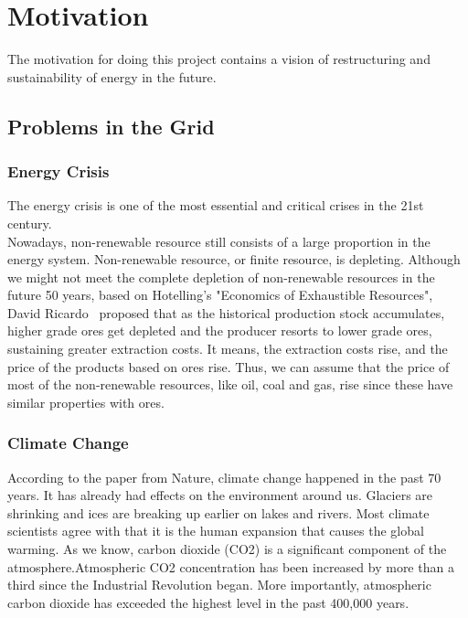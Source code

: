 \section{Motivation} %
The motivation for doing this project contains a vision of restructuring and sustainability of energy in the future.
\subsection{Problems in the Grid}
\subsubsection{Energy Crisis}
The energy crisis is one of the most essential and critical crises in the 21st century.\\





Nowadays, non-renewable resource still consists of a large proportion in the energy system. Non-renewable resource, or finite resource, is depleting. Although we might not meet the complete depletion of non-renewable resources in the future 50 years, based on Hotelling’s "Economics of Exhaustible Resources", David Ricardo~\cite{devarajan1981hotelling} proposed that as the historical production stock accumulates, higher grade ores get depleted and the producer resorts to lower grade ores, sustaining greater extraction costs. It means, the extraction costs rise, and the price of the products based on ores rise. Thus, we can assume that the price of most of the non-renewable resources, like oil, coal and gas, rise since these have similar properties with ores.\\

\subsubsection{Climate Change}
According to the paper from Nature, climate change happened in the past 70 years. It has already had effects on the environment around us. Glaciers are shrinking and ices are breaking up earlier on lakes and rivers. Most climate scientists agree with that it is the human expansion that causes the global warming. As we know, carbon dioxide (CO2) is a significant component of the atmosphere.Atmospheric CO2 concentration has been increased by more than a third since the Industrial Revolution began. More importantly, atmospheric carbon dioxide has exceeded the highest level in the past 400,000 years.\\

